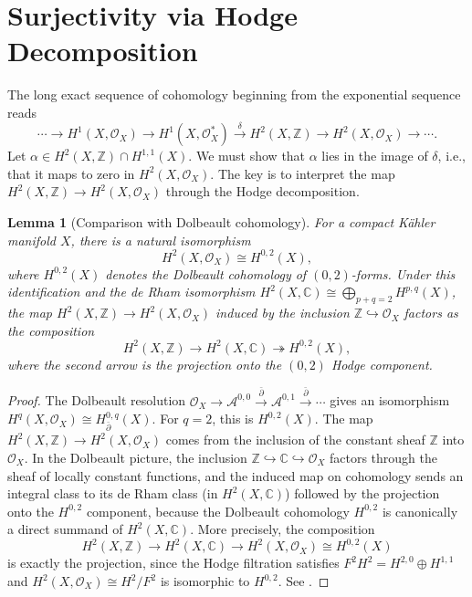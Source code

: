 \documentclass[12pt]{article}
\theoremstyle{plain}
\newtheorem{lemma}[theorem]{Lemma}
\theoremstyle{definition}
\begin{document}
\section{Surjectivity via Hodge Decomposition}

The long exact sequence of cohomology beginning from the exponential sequence reads
\[
\cdots \longrightarrow H^1(X,\mathcal O_X) \longrightarrow H^1(X,\mathcal O_X^*) \xrightarrow{\;\delta\;} H^2(X,\mathbb Z) \longrightarrow H^2(X,\mathcal O_X) \longrightarrow \cdots .
\]
Let $\alpha \in H^2(X,\mathbb Z) \cap H^{1,1}(X)$. We must show that $\alpha$ lies in the image of $\delta$, i.e., that it maps to zero in $H^2(X,\mathcal O_X)$. The key is to interpret the map $H^2(X,\mathbb Z) \to H^2(X,\mathcal O_X)$ through the Hodge decomposition.

\begin{lemma}[Comparison with Dolbeault cohomology]\label{lem:H2-O}
For a compact K\"ahler manifold $X$, there is a natural isomorphism
\[
H^2(X,\mathcal O_X) \cong H^{0,2}(X),
\]
where $H^{0,2}(X)$ denotes the Dolbeault cohomology of $(0,2)$-forms. Under this identification and the de Rham isomorphism $H^2(X,\mathbb C) \cong \bigoplus_{p+q=2} H^{p,q}(X)$, the map $H^2(X,\mathbb Z) \to H^2(X,\mathcal O_X)$ induced by the inclusion $\mathbb Z \hookrightarrow \mathcal O_X$ factors as the composition
\[
H^2(X,\mathbb Z) \longrightarrow H^2(X,\mathbb C) \twoheadrightarrow H^{0,2}(X),
\]
where the second arrow is the projection onto the $(0,2)$ Hodge component.
\end{lemma}

\begin{proof}
The Dolbeault resolution $\mathcal O_X \to \mathcal A^{0,0} \xrightarrow{\bar\partial} \mathcal A^{0,1} \xrightarrow{\bar\partial} \cdots$ gives an isomorphism $H^q(X,\mathcal O_X) \cong H_{\bar\partial}^{0,q}(X)$. For $q=2$, this is $H^{0,2}(X)$. The map $H^2(X,\mathbb Z) \to H^2(X,\mathcal O_X)$ comes from the inclusion of the constant sheaf $\mathbb Z$ into $\mathcal O_X$. In the Dolbeault picture, the inclusion $\mathbb Z \hookrightarrow \mathbb C \hookrightarrow \mathcal O_X$ factors through the sheaf of locally constant functions, and the induced map on cohomology sends an integral class to its de Rham class (in $H^2(X,\mathbb C)$) followed by the projection onto the $H^{0,2}$ component, because the Dolbeault cohomology $H^{0,2}$ is canonically a direct summand of $H^2(X,\mathbb C)$. More precisely, the composition
\[
H^2(X,\mathbb Z) \to H^2(X,\mathbb C) \to H^2(X,\mathcal O_X) \cong H^{0,2}(X)
\]
is exactly the projection, since the Hodge filtration satisfies $F^2 H^2 = H^{2,0} \oplus H^{1,1}$ and $H^2(X,\mathcal O_X) \cong H^2 / F^2$ is isomorphic to $H^{0,2}$. See \cite{voisin-hodge}.
\end{proof}
\end{document}
